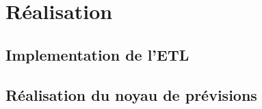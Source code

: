 \chapter{Réalisation}
	\section{Implementation de l'ETL}
	\section{Réalisation du noyau de prévisions}